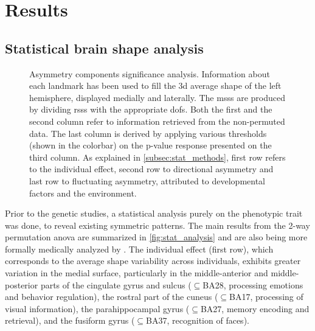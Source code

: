 \chapter{Results}\label{chap:results}
\section{Statistical brain shape analysis}

\begin{figure}[H]
	\centering
	\begin{adjustwidth}{-3cm}{-2.5cm}
	
	\end{adjustwidth}
	\begin{adjustwidth}{-1cm}{-1cm}
	\caption[Statistical brain shape analysis results]{Asymmetry components significance analysis. Information about each landmark has been used to fill the \ac{3d} average shape of the left hemisphere, displayed medially and laterally. The \acsp{mss} are produced by dividing \acsp{rss} with the appropriate \acp{dof}. Both the first and the second column refer to information retrieved from the non-permuted data. The last column is derived by applying various thresholds (shown in the colorbar) on the p-value response presented on the third column. As explained in \autoref{subsec:stat_methods}, first row refers to the individual effect, second row to directional asymmetry and last row to fluctuating asymmetry, attributed to developmental factors and the environment.}
	\label{fig:stat_analysis}	
	\end{adjustwidth}
\end{figure}

Prior to the genetic studies, a statistical analysis purely on the phenotypic trait was done, to reveal existing symmetric patterns. The main results from the 2-way permutation \ac{anova} are summarized in \autoref{fig:stat_analysis} and are also being more formally medically analyzed by \citet{Vanbiervliet2022}. The individual effect (first row), which corresponds to the average shape variability across individuals, exhibits greater variation in the medial surface, particularly in the middle-anterior and middle-posterior parts of the cingulate gyrus and sulcus ($\subseteq$BA28, processing emotions and behavior regulation), the rostral part of the cuneus ($\subseteq$BA17, processing of visual information), the parahippocampal gyrus ($\subseteq$BA27, memory encoding and retrieval), and the fusiform gyrus ($\subseteq$BA37, recognition of faces). 

